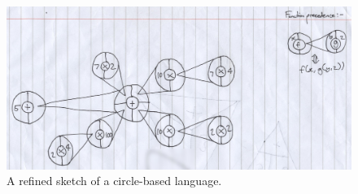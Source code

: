 \documentclass[12pt,twoside,notitlepage,xetex]{report}
\begin{document}
\begin{center}
\begin{figure}[H]
\begin{center}
\includegraphics[width=\textwidth]{figs/mockups/sketches/21/21a.jpg}
\end{center}
\caption{A refined sketch of a circle-based language.}
\label{fig:Circs2}
\end{figure}
\end{center}


\end{document}
